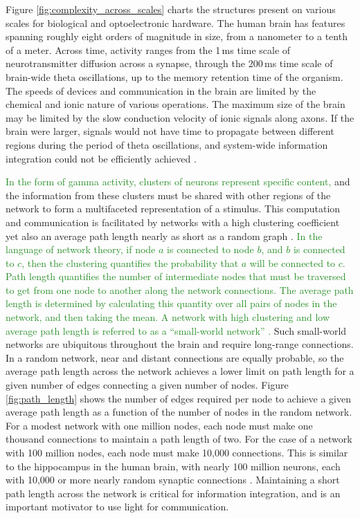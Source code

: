 \documentclass{article}
\begin{document}
\begin{multicols}{2}
Figure \ref{fig:complexity_across_scales} charts the structures present on various scales for biological and optoelectronic hardware. The human brain has features spanning roughly eight orders of magnitude in size, from a nanometer to a tenth of a meter. Across time, activity ranges from the 1\,ms time scale of neurotransmitter diffusion across a synapse, through the 200\,ms time scale of brain-wide theta oscillations, up to the memory retention time of the organism. The speeds of devices and communication in the brain are limited by the chemical and ionic nature of various operations. The maximum size of the brain may be limited by the slow conduction velocity of ionic signals along axons. If the brain were larger, signals would not have time to propagate between different regions during the period of theta oscillations, and system-wide information integration could not be efficiently achieved \cite{bu2006,sh2019}.

\textcolor{ForestGreen}{In the form of gamma activity, clusters of neurons represent specific content,} and the information from these clusters must be shared with other regions of the network to form a multifaceted representation of a stimulus. This computation and communication is facilitated by networks with a high clustering coefficient yet also an average path length nearly as short as a random graph \cite{eskn2015}. \textcolor{ForestGreen}{In the language of network theory, if node $a$ is connected to node $b$, and $b$ is connected to $c$, then the clustering quantifies the probability that $a$ will be connected to $c$. Path length quantifies the number of intermediate nodes that must be traversed to get from one node to another along the network connections. The average path length is determined by calculating this quantity over all pairs of nodes in the network, and then taking the mean. A network with high clustering and low average path length is referred to as a ``small-world network'' \cite{wast1998}.} Such small-world networks are ubiquitous throughout the brain \cite{sp2010} and require long-range connections. In a random network, near and distant connections are equally probable, so the average path length across the network achieves a lower limit on path length for a given number of edges connecting a given number of nodes. Figure \ref{fig:path_length} shows the number of edges required per node to achieve a given average path length as a function of the number of nodes in the random network. For a modest network with one million nodes, each node must make one thousand connections to maintain a path length of two. For the case of a network with 100 million nodes, each node must make 10,000 connections. This is similar to the hippocampus in the human brain, with nearly 100 million neurons, each with 10,000 or more nearly random synaptic connections \cite{bu2006}. Maintaining a short path length across the network is critical for information integration, and is an important motivator to use light for communication.


\end{multicols}
\end{document}
